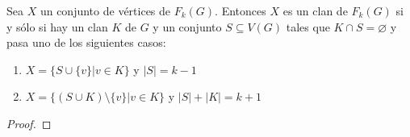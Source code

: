     \begin{teorema}
        \label{teo:primero}
        Sea $X$ un conjunto de v\'ertices de $F_k(G)$. Entonces $X$ es un clan
        de $F_k(G)$ si y s\'olo si hay un clan $K$ de $G$ y un conjunto $S
        \subseteq V(G)$ tales que $K \cap S = \varnothing$ y pasa uno de los
        siguientes casos:
        \begin{enumerate}
            \item $X = \{S \cup \{v\}| v \in K\}$ y $|S| = k-1$
            \item $X = \{(S\cup K) \setminus \{v\}| v \in K \}$ y $|S| + |K| =
            k+1$
        \end{enumerate}
    \end{teorema}

    \begin{proof}
        
    \end{proof}